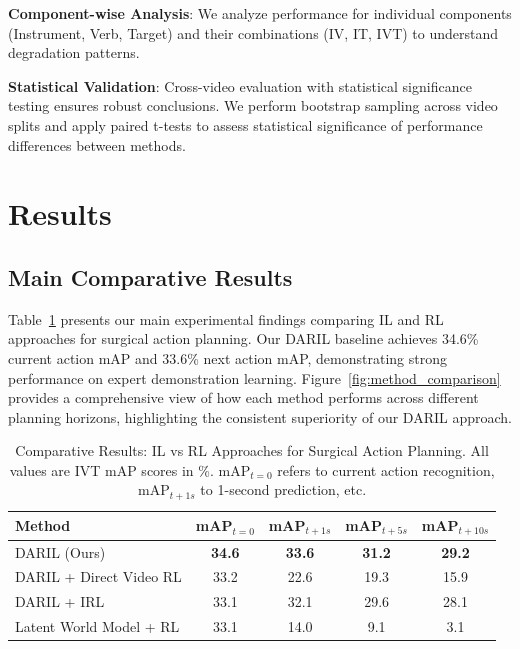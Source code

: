 \documentclass[runningheads]{llncs}
\begin{document}
\textbf{Component-wise Analysis}: We analyze performance for individual components (Instrument, Verb, Target) and their combinations (IV, IT, IVT) to understand degradation patterns.

\textbf{Statistical Validation}: Cross-video evaluation with statistical significance testing ensures robust conclusions. We perform bootstrap sampling across video splits and apply paired t-tests to assess statistical significance of performance differences between methods.


\section{Results}

\subsection{Main Comparative Results}

Table~\ref{tab:main_results} presents our main experimental findings comparing IL and RL approaches for surgical action planning. Our DARIL baseline achieves 34.6\% current action mAP and 33.6\% next action mAP, demonstrating strong performance on expert demonstration learning. Figure~\ref{fig:method_comparison} provides a comprehensive view of how each method performs across different planning horizons, highlighting the consistent superiority of our DARIL approach.

\begin{table}[h]
\centering
\caption{Comparative Results: IL vs RL Approaches for Surgical Action Planning. All values are IVT mAP scores in \%. mAP$_{t=0}$ refers to current action recognition, mAP$_{t+1s}$ to 1-second prediction, etc.}
\label{tab:main_results}
\begin{tabular}{lcccc}
\toprule
\textbf{Method} & \textbf{mAP$_{t=0}$} & \textbf{mAP$_{t+1s}$} & \textbf{mAP$_{t+5s}$} & \textbf{mAP$_{t+10s}$} \\
\midrule
DARIL (Ours) & \textbf{34.6} & \textbf{33.6} & \textbf{31.2} & \textbf{29.2} \\
\midrule
DARIL + Direct Video RL & 33.2 & 22.6 & 19.3 & 15.9 \\
DARIL + IRL & 33.1 & 32.1 & 29.6 & 28.1 \\
Latent World Model + RL & 33.1 & 14.0 & 9.1 & 3.1 \\
\bottomrule
\end{tabular}
\end{table}
\end{document}
